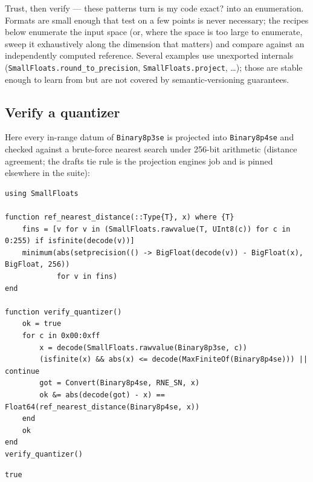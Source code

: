 \label{11797808841028591813}{}


Trust, then verify — these patterns turn {\textquotedbl}is my code exact?{\textquotedbl} into an enumeration. Formats are small enough that {\textquotedbl}test on a few points{\textquotedbl} is never necessary; the recipes below enumerate the input space (or, where the space is too large to enumerate, sweep it exhaustively along the dimension that matters) and compare against an independently computed reference. Several examples use unexported internals (\texttt{SmallFloats.round\_\allowbreak{}to\_\allowbreak{}precision}, \texttt{SmallFloats.project}, …); those are stable enough to learn from but are not covered by semantic-versioning guarantees.



\subsection{Verify a quantizer}



\label{18302297634694141278}{}


Here every in-range datum of \texttt{Binary8p3se} is projected into \texttt{Binary8p4se} and checked against a brute-force nearest search under 256-bit arithmetic (distance agreement; the draft{\textquotesingle}s tie rule is the projection engine{\textquotesingle}s job and is pinned elsewhere in the suite):




\nopagebreak[4]
\begin{minipage}{\linewidth}
\begin{verbatim}
using SmallFloats

function ref_nearest_distance(::Type{T}, x) where {T}
    fins = [v for v in (SmallFloats.rawvalue(T, UInt8(c)) for c in 0:255) if isfinite(decode(v))]
    minimum(abs(setprecision(() -> BigFloat(decode(v)) - BigFloat(x), BigFloat, 256))
            for v in fins)
end

function verify_quantizer()
    ok = true
    for c in 0x00:0xff
        x = decode(SmallFloats.rawvalue(Binary8p3se, c))
        (isfinite(x) && abs(x) <= decode(MaxFiniteOf(Binary8p4se))) || continue
        got = Convert(Binary8p4se, RNE_SN, x)
        ok &= abs(decode(got) - x) == Float64(ref_nearest_distance(Binary8p4se, x))
    end
    ok
end
verify_quantizer()
\end{verbatim}




\begin{verbatim}
true
\end{verbatim}
\end{minipage}




